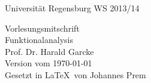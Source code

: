 \begin{titlepage}
    \Large
        Universität Regensburg \hfill WS 2013/14 \\
    \vspace{4cm}
    \begin{center}
        \small
            Vorlesungsmitschrift\\[1cm]
        \Huge 
            Funktionalanalysis\\[2cm]
        \Large
            Prof. Dr. Harald Garcke\\
        \vfill
        \small
            Version vom \today \\[0.8cm]
            Gesetzt in \LaTeX\ von Johannes Prem
        \vspace*{3cm}
    \end{center}
\end{titlepage}

